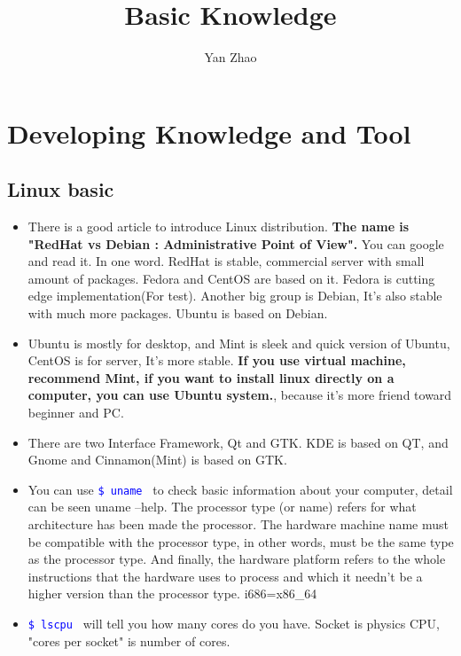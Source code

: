 \documentclass[a4paper,12pt,twoside]{book}
\newcommand{\linuxcommand}[1]{\texttt{\textcolor{blue}{\$ #1 \Pisymbol{psy}{191}}}}
\begin{document}
\title{Basic Knowledge}
\author{Yan Zhao}
\date{}\maketitle

\tableofcontents

\else
\chapter{Developing Knowledge and Tool}
\fi

\section{Linux basic}
\begin{itemize}
		\item There is a good article to introduce Linux distribution. \textbf{The name is "RedHat vs Debian : Administrative Point of View".} You can google and read it. In one word. RedHat is stable, commercial server with small amount of packages. Fedora and CentOS are based on it. Fedora is cutting edge implementation(For test). Another big group is Debian, It's also stable with much more packages. Ubuntu is based on Debian.

		\item Ubuntu is mostly for desktop, and Mint is sleek and quick version of Ubuntu, CentOS is for server, It's more stable. \textbf{If you use virtual machine, recommend Mint, if you want to install linux directly on a computer, you can use Ubuntu system.}, because it's more friend toward beginner and PC. 

		\item There are two Interface Framework, Qt and GTK\@.  KDE is based on QT, and Gnome and Cinnamon(Mint) is based on GTK.  

		\item You can use \linuxcommand{uname} to check basic information about your computer, detail can be seen uname --help. The processor type (or name) refers for what architecture has been made the processor.  The hardware machine name must be compatible with the processor type, in other words, must be the same type as the processor type.  And finally, the hardware platform refers to the whole instructions that the hardware uses to process and which it needn't be a higher version than the processor type. i686=x86\_64

		\item \linuxcommand{lscpu} will tell you how many cores do you have. Socket is physics CPU, "cores per socket" is number of cores. 
\end{itemize}
\end{document}
